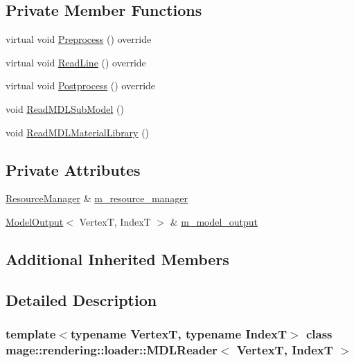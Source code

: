 \subsection*{Private Member Functions}
\begin{DoxyCompactItemize}
\item 
virtual void \mbox{\hyperlink{classmage_1_1rendering_1_1loader_1_1_m_d_l_reader_a397f0c0eedc56c983fc3a7074aa4e577}{Preprocess}} () override
\item 
virtual void \mbox{\hyperlink{classmage_1_1rendering_1_1loader_1_1_m_d_l_reader_a8b138830bd4ac4176b7a7444cdbdebfa}{Read\+Line}} () override
\item 
virtual void \mbox{\hyperlink{classmage_1_1rendering_1_1loader_1_1_m_d_l_reader_abbff75b1926904c6c0bcb0aeae8f3fdc}{Postprocess}} () override
\item 
void \mbox{\hyperlink{classmage_1_1rendering_1_1loader_1_1_m_d_l_reader_afe15d41185ac5f4de6607561d7068d8c}{Read\+M\+D\+L\+Sub\+Model}} ()
\item 
void \mbox{\hyperlink{classmage_1_1rendering_1_1loader_1_1_m_d_l_reader_a40697c5c645e00ba6f4cc5cd28872b8f}{Read\+M\+D\+L\+Material\+Library}} ()
\end{DoxyCompactItemize}
\subsection*{Private Attributes}
\begin{DoxyCompactItemize}
\item 
\mbox{\hyperlink{classmage_1_1rendering_1_1_resource_manager}{Resource\+Manager}} \& \mbox{\hyperlink{classmage_1_1rendering_1_1loader_1_1_m_d_l_reader_ae1a276e89104344daa25666e4b074643}{m\+\_\+resource\+\_\+manager}}
\item 
\mbox{\hyperlink{structmage_1_1rendering_1_1_model_output}{Model\+Output}}$<$ VertexT, IndexT $>$ \& \mbox{\hyperlink{classmage_1_1rendering_1_1loader_1_1_m_d_l_reader_aab6301fae258aaea1619856000a29e53}{m\+\_\+model\+\_\+output}}
\end{DoxyCompactItemize}
\subsection*{Additional Inherited Members}


\subsection{Detailed Description}
\subsubsection*{template$<$typename VertexT, typename IndexT$>$\newline
class mage\+::rendering\+::loader\+::\+M\+D\+L\+Reader$<$ Vertex\+T, Index\+T $>$}

